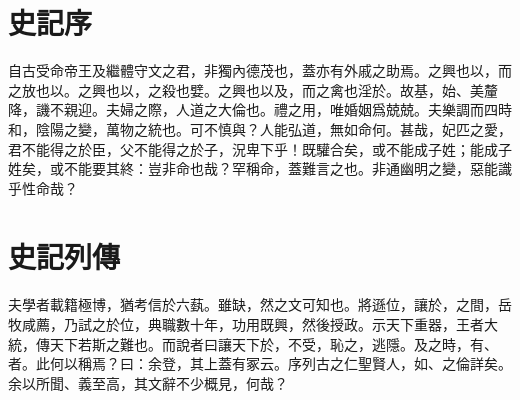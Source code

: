 \section[外戚世家序\quad{\small 史記}]{{\normalsize 史記}\quad {}序}
自古受命帝王及繼體守文之君，非獨內德茂也，蓋亦有外戚之助焉。之興也以，而之放也以。之興也以，之殺也嬖。之興也以及，而之禽也淫於。故基，始、美釐降，譏不親迎。夫婦之際，人道之大倫也。禮之用，唯婚姻爲兢兢。夫樂調而四時和，陰陽之變，萬物之統也。可不慎與？人能弘道，無如命何。甚哉，妃匹之愛，君不能得之於臣，父不能得之於子，況卑下乎！既驩合矣，或不能成子姓；能成子姓矣，或不能要其終：豈非命也哉？罕稱命，蓋難言之也。非通幽明之變，惡能識乎性命哉？

\theendnotes

\section[伯夷列傳\quad{\small 史記}]{{\normalsize 史記}\quad{}列傳}
夫學者載籍極博，猶考信於六蓺。雖缺，然之文可知也。將遜位，讓於，之間，岳牧咸薦，乃試之於位，典職數十年，功用既興，然後授政。示天下重器，王者大統，傳天下若斯之難也。而說者曰讓天下於，不受，恥之，逃隱。及之時，有、者。此何以稱焉？曰：余登，其上蓋有冢云。序列古之仁聖賢人，如、之倫詳矣。余以所聞、義至高，其文辭不少概見，何哉？

